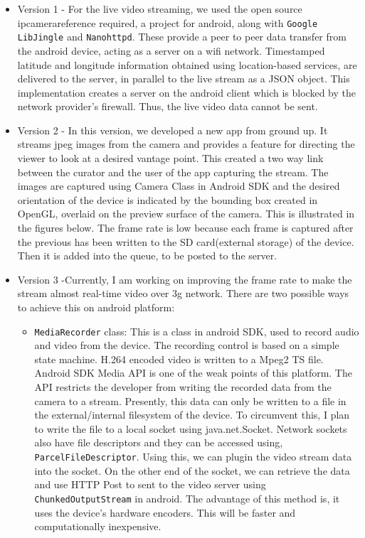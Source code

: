 	\begin{itemize}
		\item Version 1 -  For the live video streaming, we used the open source ipcamera{reference required}, a project for android, along with \texttt{Google LibJingle} and \texttt{Nanohttpd}. These provide a peer to peer data transfer from the android device, acting as a server on a wifi network. Timestamped latitude and longitude information obtained using location-based services, are delivered to the server, in parallel to the live stream as a JSON object. This implementation creates a server on the android client which is blocked by the network provider’s firewall. Thus, the live video data cannot be sent.
		\item Version 2 - In this version, we developed a new app from ground up. It streams jpeg images from the camera and provides a feature for directing the viewer to look at a desired vantage point. This created a two way link between the curator and the user of the app capturing the stream. The images are captured using Camera Class in Android SDK and the desired orientation of the device is indicated by the bounding box created in OpenGL, overlaid on the preview surface of the camera. This is illustrated in the figures below. The frame rate is low because each frame is captured after the previous has been written to the SD card(external storage) of the device. Then it is added into the queue, to be posted to the server.
		\item Version 3 -Currently, I am working on improving the frame rate to make the stream almost real-time video over 3g network. There are two possible ways to achieve this on android platform:
		\begin{itemize}
			\item \texttt{MediaRecorder} class: This is a class in android SDK, used to record audio and video from the device. The recording control is based on a simple state machine. H.264 encoded video is written to a Mpeg2 TS file. Android SDK Media API is one of the weak points of this platform. The API restricts the developer from writing the recorded data from the camera to a stream. Presently, this data can only be written to a file in the external/internal filesystem of the device. To circumvent this, I plan to write the file to a local socket using java.net.Socket. Network sockets also have file descriptors and they can be accessed using, \texttt{ParcelFileDescriptor}. Using this, we can plugin the video stream data into the socket. On the other end of the socket, we can retrieve the data and use HTTP Post to sent to the video server using \texttt{ChunkedOutputStream} in android. The advantage of this method is, it uses the device’s hardware encoders. This will be faster and computationally inexpensive. 

\end{itemize}
\end{itemize}
